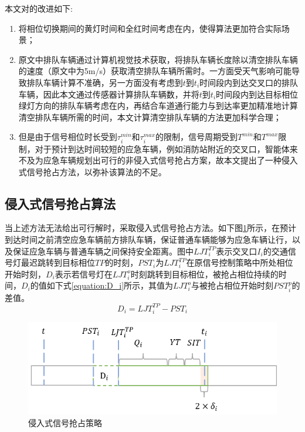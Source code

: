 本文对\cite{min}的改进如下:
\begin{enumerate}
	\item 将相位切换期间的黄灯时间和全红时间考虑在内，使得算法更加符合实际场景；
	\item 原文中排队车辆通过计算机视觉技术获取，将排队车辆长度除以清空排队车辆的速度（原文中为5m/s）获取清空排队车辆所需时。一方面受天气影响可能导致排队车辆计算不准确，另一方面没有考虑到${t}$到${t_i}$时间段内到达交叉口的排队车辆，因此本文通过传感器计算排队车辆数，并将${t}$到${t_i}$时间段内到达目标相位绿灯方向的排队车辆考虑在内，再结合车道通行能力与到达率更加精准地计算清空排队车辆所需的时间，本文计算清空排队车辆的方法更加科学合理；
	\item 但是由于信号相位时长受到${\tau_i^{min}}$和${\tau_i^{max}}$的限制，信号周期受到${T^{min}}$和${T^{max}}$限制，对于预计到达时间较短的应急车辆，例如消防站附近的交叉口，智能体来不及为应急车辆规划出可行的非侵入式信号抢占方案，故本文提出了一种侵入式信号抢占方法，以弥补该算法的不足。
\end{enumerate}

\subsection{侵入式信号抢占算法}
当上述方法无法给出可行解时，采取侵入式信号抢占方法。如下图\ref{fig:invasive}所示，在预计到达时间之前清空应急车辆前方排队车辆，保证普通车辆能够为应急车辆让行，以及保证应急车辆与普通车辆之间保持安全距离。图中${{LJT}_i^{TP}}$表示交叉口${I_i}$的交通信号灯最迟跳转到目标相位${TP}$的时刻，${PST_i}$为${{LJT}_i^{TP}}$在原信号控制策略中所处相位开始时刻，${D_i}$表示若信号灯在${{LJT}_i^o}$时刻跳转到目标相位，被抢占相位持续的时间，${D_i}$的值如下式\ref{equation:D_i}所示，其值为${{LJT}_i^o}$与被抢占相位开始时刻${{PST}_i^p}$的差值。
\begin{equation}
	\label{equation:D_i}
	D_i={LJT}_i^{TP}-PST_i
\end{equation}

\begin{figure}[ht]
	\centering
	\includegraphics[width=\textwidth]{figures/invasive.png}
	\caption{侵入式信号抢占策略}
	\label{fig:invasive}
\end{figure}

